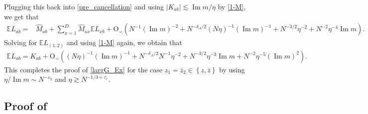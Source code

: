 \documentclass[10pt,reqno]{amsart}
\numberwithin{equation}{section}
\numberwithin{figure}{section}
\theoremstyle{plain} %
\theoremstyle{definition} %
\renewcommand{\epsilon}{\varepsilon}
\renewcommand{\bar}{\overline}
\newcommand{\p}[1]{({#1})}
\newcommand{\pa}[1]{\left({#1}\right)}
\newcommand{\ha}[1]{\left\{{#1}\right\}}
\newcommand{\absa}[1]{\left\lvert #1 \right\rvert}
\DeclareMathOperator{\im}{\mathrm{Im}}
\newcommand{\OO}{\mathrm{O}}
\numberwithin{equation}{section}
\begin{document}
Plugging this back into \eqref{pre_cancellation} and using $\absa{K_{ab}}\lesssim \im m/\eta$ by \eqref{1-M}, we get that
\begin{equation}\nonumber
    \begin{aligned}
        \mathbb{E} L_{a b}=&\widehat{M}_{a b}+\sum_{x=1}^D \widehat{M}_{a x} \mathbb{E} L_{x b} +\OO_{\prec}\left(N^{-1}(\operatorname{Im} m)^{-2}+N^{-\delta_A / 2}(N \eta)^{-1}(\operatorname{Im} m)^{-1}+ N^{-3 / 2}\eta^{-2}+N^{-2}\eta^{-4} \im m\right) .
    \end{aligned}
\end{equation}
Solving for $\mathbb{E} L_{(1,2)}$ and using \eqref{1-M} again, we obtain that
\begin{equation}\nonumber
    \begin{aligned}
        \mathbb{E} L_{a b}=K_{a b}+\OO_{\prec}\left(\p{N \eta}^{-1}(\operatorname{Im} m)^{-1}+N^{-\delta_A / 2} N^{-1} \eta^{-2}+N^{-3 / 2} \eta^{-3} \operatorname{Im} m+N^{-2} \eta^{-5} \pa{\operatorname{Im} m}^2\right).
    \end{aligned}
\end{equation}
This completes the proof of \eqref{largG_Ex} for the case $z_1=\bar{z}_2\in\ha{z,\bar{z}}$ by using $\eta / \operatorname{Im} m \sim N^{-\epsilon_g}$ and $\eta \gtrsim N^{-1 / 3+\tau_e}$.

\subsection{Proof of }\label{proof_of_lem_flow}
\end{document}
